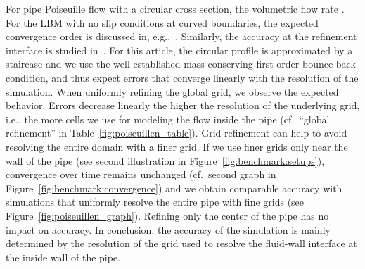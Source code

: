 \documentclass[final,leqno,onefignum,onetabnum]{siamltex1213}
\begin{document}
For pipe Poiseuille flow with a circular cross section,
the volumetric flow rate .
For the LBM with no slip conditions at curved boundaries, the expected convergence order is discussed in, e.g.,~\cite{Ginzburg2008}.
Similarly, the accuracy at the refinement interface is studied in~\cite{Rohde2006}.
For this article, the circular profile is approximated by a staircase
and we use the well-established mass-conserving first order bounce back condition,
and thus expect errors that converge linearly with the resolution of the simulation.
When uniformly refining the global grid,
we observe the expected behavior.
Errors decrease linearly the higher the resolution of the underlying grid,
i.e., the more cells we use for modeling the flow inside the pipe (cf.\ ``global refinement'' in Table~\ref{fig:poiseuillen_table}).
Grid refinement can help to avoid resolving the entire domain with a finer grid.
If we use finer grids only near the wall of the pipe (see second illustration in Figure~\ref{fig:benchmark:setups}),
convergence over time remains unchanged (cf.\ second graph in Figure~\ref{fig:benchmark:convergence}) and
we obtain comparable accuracy with simulations that uniformly resolve the entire pipe with fine grids
(see Figure~\ref{fig:poiseuillen_graph}).
Refining only the center of the pipe has no impact on accuracy.
In conclusion, the accuracy of the simulation
is mainly determined by the resolution of the grid used to resolve the fluid-wall interface at the inside wall of the pipe.
\end{document}
